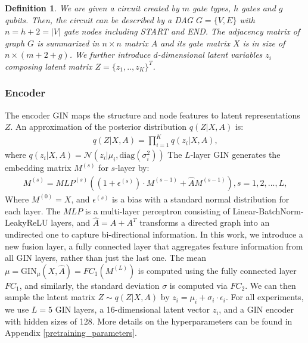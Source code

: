\documentclass{article} %
\newtheorem{definition}{Definition}
\begin{document}
\begin{definition} We are given a circuit created by $m$ gate types, $h$ gates and $g$ qubits. Then, the circuit can be described by a DAG $G=\{V, E\}$ with $n=h+2=|V|$ gate nodes including START and END. The adjacency matrix of graph $G$ is summarized in $n\times n$ matrix $A$ and its gate matrix $X$ is in size of $n \times (m+2+g)$. We further introduce $d$-dimensional latent variables $z_i$ composing latent matrix $Z=\{z_1,..,z_K\}^T$.
\end{definition}

\subsubsection{Encoder}
The encoder GIN maps the structure and node features to latent representations $Z$. An approximation of the posterior distribution $q(Z|X,A)$ is:
\begin{align}
    q(Z|X,A)=\prod^K_{i=1}q(z_i|X,A)\text{,}
\end{align}
where $q(z_i|X,A)=\mathcal{N}(z_i|\mu_i, \text{diag}(\sigma^2_i))$
The $L$-layer GIN generates the embedding matrix $M^{(s)}$ for $s$-layer by:
\begin{align}
    M^{(s)}=MLP^{(s)}((1+\epsilon^{(s)})\cdot M^{(s-1)}+\hat{A}M^{(s-1)}), s=1,2,...,L\text{,}
    \label{mlp}
\end{align}
Where $M^{(0)} = X$, and $\epsilon^{(s)}$ is a bias with a standard normal distribution for each layer. The $MLP$ is a multi-layer perceptron consisting of Linear-BatchNorm-LeakyReLU layers, and $\hat{A} = A + A^T$ transforms a directed graph into an undirected one to capture bi-directional information. In this work, we introduce a new fusion layer, a fully connected layer that aggregates feature information from all GIN layers, rather than just the last one. The mean $\mu = \text{GIN}_\mu(X, \hat{A}) = FC_1(M^{(L)})$ is computed using the fully connected layer $FC_1$, and similarly, the standard deviation $\sigma$ is computed via $FC_2$. We can then sample the latent matrix $Z \sim q(Z|X, A)$ by $z_i = \mu_i + \sigma_i \cdot \epsilon_i$.
For all experiments, we use $L = 5$ GIN layers, a 16-dimensional latent vector $z_i$, and a GIN encoder with hidden sizes of 128. More details on the hyperparameters can be found in Appendix \ref{pretraining_parameters}.
\end{document}
